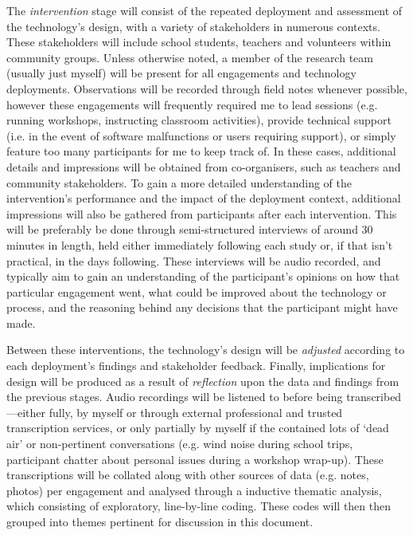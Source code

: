 The \textit{intervention} stage will consist of the repeated deployment and assessment of the technology's design, with a variety of stakeholders in numerous contexts. These stakeholders will include school students, teachers and volunteers within community groups. Unless otherwise noted, a member of the research team (usually just myself) will be present for all engagements and technology deployments. Observations will be recorded through field notes whenever possible, however these engagements will frequently required me to lead sessions (e.g. running workshops, instructing classroom activities), provide technical support (i.e. in the event of software malfunctions or users requiring support), or simply feature too many participants for me to keep track of. In these cases, additional details and impressions will be obtained from co-organisers, such as teachers and community stakeholders. To gain a more detailed understanding of the intervention's performance and the impact of the deployment context, additional impressions will also be gathered from participants after each intervention. This will be preferably be done through semi-structured interviews of around 30 minutes in length, held either immediately following each study or, if that isn't practical, in the days following. These interviews will be audio recorded, and typically aim to gain an understanding of the participant's opinions on how that particular engagement went, what could be improved about the technology or process, and the reasoning behind any decisions that the participant might have made.

Between these interventions, the technology's design will be \textit{adjusted} according to each deployment's findings and stakeholder feedback. Finally, implications for design will be produced as a result of \textit{reflection} upon the data and findings from the previous stages. Audio recordings will be listened to before being transcribed---either fully, by myself or through external professional and trusted transcription services, or only partially by myself if the contained lots of `dead air' or non-pertinent conversations (e.g. wind noise during school trips, participant chatter about personal issues during a workshop wrap-up). These transcriptions will be collated along with other sources of data (e.g. notes, photos) per engagement and analysed through a inductive thematic analysis, which consisting of exploratory, line-by-line coding. These codes will then then grouped into themes pertinent for discussion in this document.

